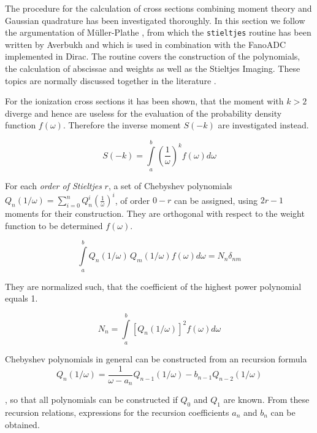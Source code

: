 The procedure for the calculation of cross sections combining moment
theory and Gaussian quadrature has been investigated thoroughly. In this section
we follow the argumentation of Müller-Plathe \cite{MuellerPlathe90}, from which the
\verb|stieltjes| routine has been written by Averbukh and which is used in
combination with the FanoADC implemented in Dirac. The routine covers 
the construction of the polynomials, the calculation of abscissae and weights as well
as the Stieltjes Imaging. These topics are normally discussed together in the
literature \cite{MuellerPlathe89,Corcoran77,Langhoff76}.

For the ionization cross sections it has been shown, that the moment with
$k>2$ diverge and hence are useless for the evaluation of the probability
density function $f(\omega)$. Therefore the inverse moment $S(-k)$ are investigated
instead.

\begin{equation}
  S(-k) = \int\limits_a^b \left( \frac{1}{\omega} \right) ^k f(\omega) d\omega
\end{equation}

For each \emph{order of Stieltjes} $r$, a set of
Chebyshev polynomials
$Q_n (1/\omega) = \sum\limits_{i=0}^n Q_n^{i}\left( \frac{1}{\omega} \right)^{i}$,
of order $0-r$ can be assigned, using $2r-1$ moments for their construction.
They are orthogonal with respect to the weight function
to be determined $f(\omega)$.

\begin{equation}
  \int\limits_a^b Q_n(1/\omega) \, Q_m(1/\omega) f(\omega) d\omega = N_n \delta_{nm}
\end{equation}

They are normalized such, that the coefficient of the highest power polynomial
equals 1.

\begin{equation}
  N_n = \int\limits_a^b \left[ Q_n(1/\omega) \right]^2 f(\omega) d\omega
\end{equation}

Chebyshev polynomials in general can be constructed from an recursion formula
\begin{equation}
  Q_n(1/\omega) = \frac{1}{\omega - a_n} Q_{n-1}(1/\omega) - b_{n-1} Q_{n-2}(1/\omega)
\end{equation}

, so that all polynomials can be constructed if $Q_0$ and $Q_1$ are known.
From these recursion relations, expressions for the recursion coefficients
$a_n$ and $b_n$ can be obtained.

